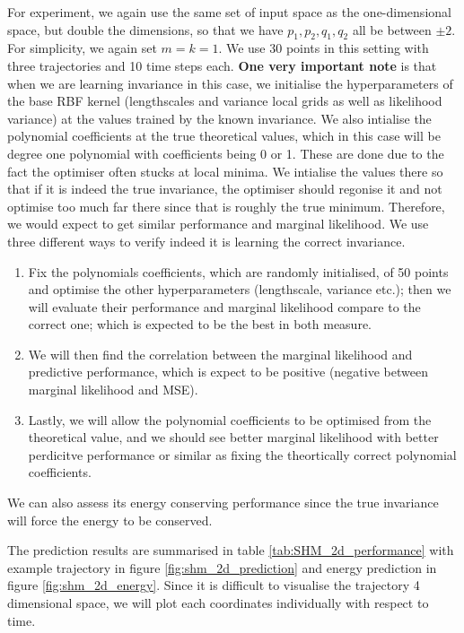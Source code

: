 \documentclass{statsmsc}
\begin{document}
For experiment, we again use the same set of input space as the one-dimensional space, but double the dimensions, so that we have $p_1, p_2, q_1, q_2$ all be between $\pm 2$. 
For simplicity, we again set $m=k=1$.
We use 30 points in this setting with three trajectories and 10 time steps each.
\textbf{One very important note} is that when we are learning invariance in this case, we initialise the hyperparameters of the base RBF kernel (lengthscales and variance local grids as well as likelihood variance) at the values trained by the known invariance.
We also intialise the polynomial coefficients at the true theoretical values, which in this case will be degree one polynomial with coefficients being 0 or 1.
These are done due to the fact the optimiser often stucks at local minima.
We intialise the values there so that if it is indeed the true invariance, the optimiser should regonise it and not optimise too much far there since that is roughly the true minimum.
Therefore, we would expect to get similar performance and marginal likelihood.
We use three different ways to verify indeed it is learning the correct invariance.
\begin{enumerate}
  \item Fix the polynomials coefficients, which are randomly initialised, of 50 points and optimise the other hyperparameters (lengthscale, variance etc.); then we will evaluate their performance and marginal likelihood compare to the correct one; which is expected to be the best in both measure. 
  \item We will then find the correlation between the marginal likelihood and predictive performance, which is expect to be positive (negative between marginal likelihood and MSE).
  \item Lastly, we will allow the polynomial coefficients to be optimised from the theoretical value, and we should see better marginal likelihood with better perdicitve performance or similar as fixing the theortically correct polynomial coefficients.
\end{enumerate}

We can also assess its energy conserving performance since the true invariance will force the energy to be conserved. 

The prediction results are summarised in table \ref{tab:SHM_2d_performance} with example trajectory in figure \ref{fig:shm_2d_prediction} and energy prediction in figure \ref{fig:shm_2d_energy}.
Since it is difficult to visualise the trajectory 4 dimensional space, we will plot each coordinates individually with respect to time.
\end{document}
